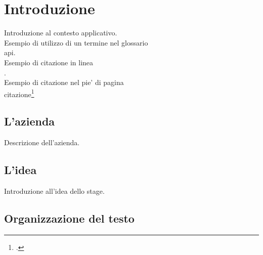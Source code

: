 \chapter{Introduzione}
\label{cap:introduzione}

Introduzione al contesto applicativo.\\

\noindent Esempio di utilizzo di un termine nel glossario \\
\gls{api}. \\

\noindent Esempio di citazione in linea \\
\cite{site:agile-manifesto}. \\

\noindent Esempio di citazione nel pie' di pagina \\
citazione\footcite{womak:lean-thinking} \\

\section{L'azienda}

Descrizione dell'azienda.

\section{L'idea}

Introduzione all'idea dello stage.

\section{Organizzazione del testo}

